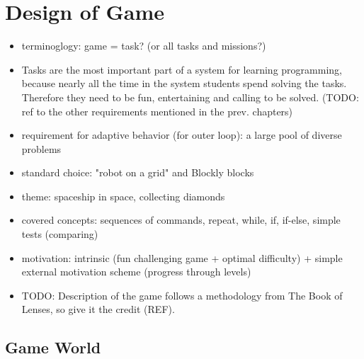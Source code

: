 \chapter{Design of Game}
\label{chap:design-of-game}

\begin{itemize}
\item terminoglogy: game = task? (or all tasks and missions?)
\item Tasks are the most important part of a system for learning programming,
because nearly all the time in the system students spend solving the tasks.
Therefore they need to be fun, entertaining and calling to be solved.
(TODO: ref to the other requirements mentioned in the prev. chapters)
\item requirement for adaptive behavior (for outer loop):
  a large pool of diverse problems
\item standard choice: "robot on a grid" and Blockly blocks
\item theme: spaceship in space, collecting diamonds
\item covered concepts: sequences of commands, repeat, while, if, if-else, simple tests (comparing)
\item motivation: intrinsic (fun challenging game + optimal difficulty)
  + simple external motivation scheme (progress through levels)
\item TODO: Description of the game follows a methodology from The Book of Lenses,
  so give it the credit (REF).
\end{itemize}



\section{Game World}  %
\label{sec:robomission.game-world}


